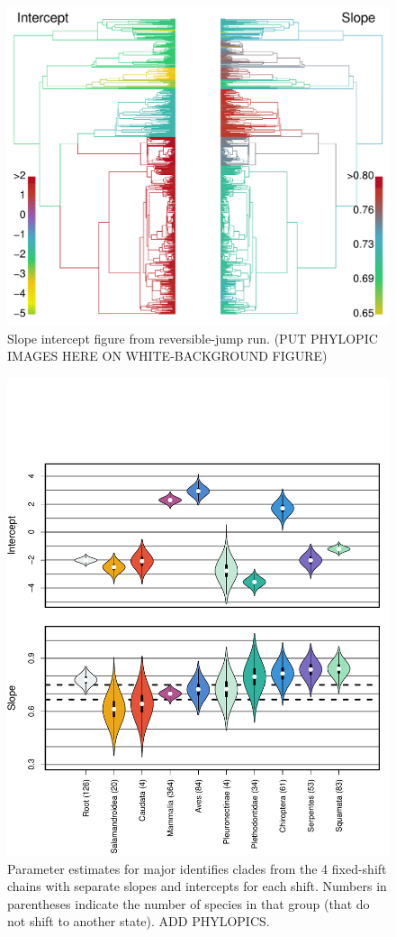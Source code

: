 \documentclass[a4paper,11pt]{article}
\begin{document}
\begin{figure}
\centering
\includegraphics[scale=0.4]{figs/slopeint.pdf}
\caption{Slope intercept figure from reversible-jump run. (PUT PHYLOPIC IMAGES HERE ON WHITE-BACKGROUND FIGURE)}
\label{slopeint}
\end{figure}

\begin{figure}
\centering
\includegraphics[scale=0.6]{figs/boxplots.pdf}
\caption{Parameter estimates for major identifies clades from the 4 fixed-shift chains with separate slopes and intercepts for each shift. Numbers in parentheses indicate the number of species in that group (that do not shift to another state). ADD PHYLOPICS.}
\label{boxplots}
\end{figure}
\end{document}
